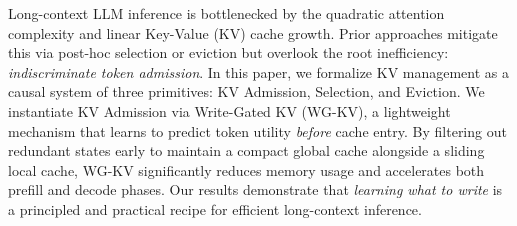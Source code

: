\begin{abstract}

長上下文大型語言模型的推論效能，受限於注意力機制的二次方複雜度，以及呈線性增長的鍵值（Key-Value）快取。先前的方法透過事後選擇或驅逐來緩解這個問題，卻忽略了導致低效的根本原因：無差別的詞元（token）准入。在本文中，我們將鍵值管理形式化為由三個基元組成的因果系統：鍵值准入（Admission）、選擇（Selection）與驅逐（Eviction）。我們透過寫入閘控鍵值（Write-Gated KV，簡稱 WG-KV）來實作鍵值准入，這是一種輕量級機制，能夠學習在詞元進入快取之前預測其效用。藉由及早過濾冗餘的狀態，以維持緊湊的全域快取並搭配滑動的區域快取，WG-KV 顯著降低了記憶體使用量，並同時加速了預填（prefill）和解碼（decode）階段。我們的結果證明，「學習該寫入什麼」為實現高效長上下文推論提供了具原則性且實用的方法。

\end{abstract}

\begin{abstract*}

Long-context LLM inference is bottlenecked by the quadratic attention complexity and linear Key-Value (KV) cache growth. Prior approaches mitigate this via post-hoc selection or eviction but overlook the root inefficiency: \textit{indiscriminate token admission}. In this paper, we formalize KV management as a causal system of three primitives: KV Admission, Selection, and Eviction. We instantiate KV Admission via Write-Gated KV (WG-KV), a lightweight mechanism that learns to predict token utility \textit{before} cache entry. By filtering out redundant states early to maintain a compact global cache alongside a sliding local cache, WG-KV significantly reduces memory usage and accelerates both prefill and decode phases. Our results demonstrate that \textit{learning what to write} is a principled and practical recipe for efficient long-context inference.

\end{abstract*}